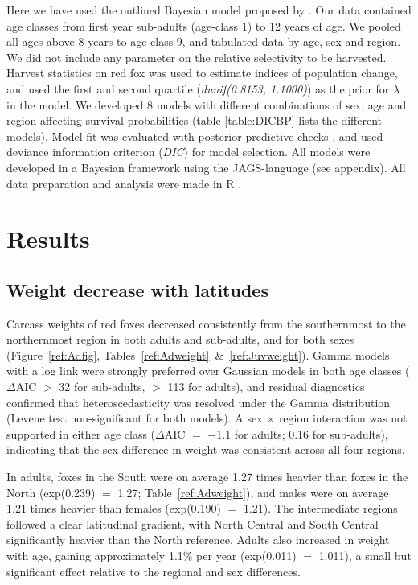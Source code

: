 \documentclass[12pt,a4paper,final,abstract=true,headings=small]{scrartcl}
\begin{document}
Here we have used the outlined Bayesian model proposed by \citet{skellyFlexibleBayesianApproach}. Our data contained age classes from first year sub-adults (age-class 1) to 12 years of age. We pooled all ages above 8 years to age class 9, and tabulated data by age, sex and region. We did not include any parameter on the relative selectivity to be harvested. Harvest statistics on red fox was used to estimate indices of population change, and used the first and second quartile (\emph{dunif(0.8153, 1.1000)}) as the prior for $\lambda$ in the model. We developed 8 models  with different combinations of sex, age and region affecting survival probabilities (table \ref{table:DICBP} lists the different models). Model fit was evaluated with posterior predictive checks \citep{keryIntroductionWinBUGSEcologists2010}, and used deviance information criterion (\emph{DIC}) for model selection. All models were developed in a Bayesian framework using the JAGS-language \citep{plummerJAGSProgramAnalysis2003b} (see appendix). All data preparation and analysis were made in R \citep{rcoreteamLanguageEnvironmentStatistical2024b}.

\section*{Results}


\subsection*{Weight decrease with latitudes}

Carcass weights of red foxes decreased consistently from the southernmost to the northernmost region in both adults and sub-adults, and for both sexes (Figure~\ref{ref:Adfig}, Tables~\ref{ref:Adweight}~\&~\ref{ref:Juvweight}). Gamma models with a log link were strongly preferred over Gaussian models in both age classes ($\Delta$AIC $>$ 32 for sub-adults, $>$ 113 for adults), and residual diagnostics confirmed that heteroscedasticity was resolved under the Gamma distribution (Levene test non-significant for both models). A sex $\times$ region interaction was not supported in either age class ($\Delta$AIC $=$ $-$1.1 for adults; 0.16 for sub-adults), indicating that the sex difference in weight was consistent across all four regions.

In adults, foxes in the South were on average 1.27 times heavier than foxes in the North (exp(0.239) $=$ 1.27; Table~\ref{ref:Adweight}), and males were on average 1.21 times heavier than females (exp(0.190) $=$ 1.21). The intermediate regions followed a clear latitudinal gradient, with North Central and South Central significantly heavier than the North reference. Adults also increased in weight with age, gaining approximately 1.1\% per year (exp(0.011) $=$ 1.011), a small but significant effect relative to the regional and sex differences.
\end{document}

